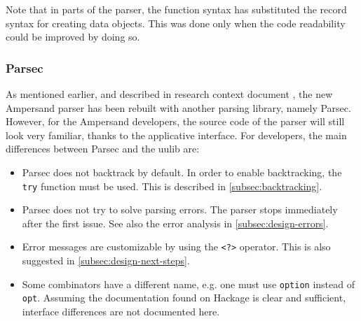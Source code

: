 Note that in parts of the parser, the function syntax has substituted the record syntax for creating data objects.
This was done only when the code readability could be improved by doing so.

\subsubsection{Parsec}
\label{subsec:design-parsing-lib}
As mentioned earlier, and described in research context document , the new Ampersand parser has been rebuilt with another parsing library, namely Parsec.
However, for the Ampersand developers, the source code of the parser will still look very familiar, thanks to the applicative interface.
For developers, the main differences between Parsec and the uulib are:
\begin{itemize}
  \item Parsec does not backtrack by default.
    In order to enable backtracking, the \texttt{try} function must be used.
    This is described in \autoref{subsec:backtracking}.
  \item Parsec does not try to solve parsing errors.
    The parser stops immediately after the first issue.
    See also the error analysis in \autoref{subsec:design-errors}.
  \item Error messages are customizable by using the \texttt{<?>} operator.
    This is also suggested in \autoref{subsec:design-next-steps}.
  \item Some combinators have a different name, e.g. one must use \texttt{option} instead of \texttt{opt}.
    Assuming the documentation found on Hackage is clear and sufficient, interface differences are not documented here.
\end{itemize}

